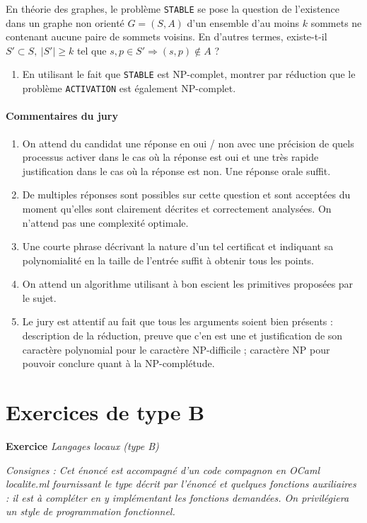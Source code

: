\documentclass[a4paper, 11pt]{article}
\newcounter{exocntr}
\newcommand{\exocommand}[1]{\stepcounter{exocntr} \textbf{Exercice \arabic{exocntr}} \textit{#1}}
\begin{document}
  En théorie des graphes, le problème \texttt{STABLE} se pose la question de l'existence dans un graphe non orienté $G=(S,A)$ d'un ensemble d'au moins $k$ sommets ne contenant aucune paire de sommets voisins. En d'autres termes, existe-t-il $S'\subset S,\ |S'|\geq k$ tel que $s,p\in S'\Rightarrow (s,p)\notin A$ ?

  \begin{enumerate}[resume]
  \item{En utilisant le fait que \texttt{STABLE} est NP-complet, montrer par réduction que le problème \texttt{ACTIVATION} est également NP-complet.}
\end{enumerate}

\paragraph{Commentaires du jury}

\begin{enumerate}
\item On attend du candidat une réponse en oui / non avec une précision de quels processus activer dans le cas où la réponse est oui et une très rapide justification dans le cas où la réponse est non. Une réponse orale suffit.
\item De multiples réponses sont possibles sur cette question et sont acceptées du moment qu'elles sont clairement décrites et correctement analysées. On n'attend pas une complexité optimale.
\item Une courte phrase décrivant la nature d'un tel certificat et indiquant sa polynomialité en la taille de l'entrée suffit à obtenir tous les points.
\item On attend un algorithme utilisant à bon escient les primitives proposées par le sujet.
\item Le jury est attentif au fait que tous les arguments soient bien présents : description de la réduction, preuve que c'en est une et justification de son caractère polynomial pour le caractère NP-difficile ; caractère NP pour pouvoir conclure quant à la NP-complétude.
\end{enumerate}

\newpage

\section*{Exercices de type B}

\exocommand{Langages locaux (type B)}

\textit{Consignes : Cet énoncé est accompagné d'un code compagnon en OCaml \textsf{localite.ml} fournissant le type décrit par l'énoncé et quelques fonctions auxiliaires : il est à compléter en y implémentant les fonctions demandées. On privilégiera un style de programmation fonctionnel. }
\end{document}

